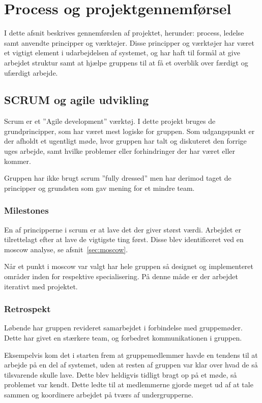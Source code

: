 \chapter{Process og projektgennemførsel}

I dette afsnit beskrives gennemførslen af projektet, herunder: process, ledelse samt anvendte principper og værktøjer. Disse principper og værktøjer har været et vigtigt element i udarbejdelsen af systemet, og har haft til formål at give arbejdet struktur samt at hjælpe gruppens til at få et overblik over færdigt og ufærdigt arbejde.

\section{SCRUM og agile udvikling}
Scrum er et ''Agile development'' \cite[kap. 1]{robertmartin2006} værktøj. I dette projekt bruges de grundprincipper, som har været mest logiske for gruppen. Som udgangspunkt er der afholdt et ugentligt møde, hvor gruppen har talt og diskuteret den forrige uges arbejde, samt hvilke problemer eller forhindringer der har været eller kommer.

Gruppen har ikke brugt scrum ''fully dressed'' men har derimod taget de principper og grundsten som gav mening for et mindre team.

\subsection{Milestones}
En af principperne i scrum er at lave det der giver størst værdi. Arbejdet er tilrettelagt efter at lave de vigtigste ting først. Disse blev identificeret ved en \gls{moscow} analyse, se afsnit~\ref{sec:moscow}.

Når et punkt i \gls{moscow} var valgt har hele gruppen så designet og implementeret områder inden for respektive specialisering. På denne måde er der arbejdet iterativt med projektet.

\subsection{Retrospekt}
Løbende har gruppen revideret samarbejdet i forbindelse med gruppemøder. Dette har givet en stærkere team, og forbedret kommunikationen i gruppen.

Eksempelvis kom det i starten frem at gruppemedlemmer havde en tendens til at arbejde på en del af systemet, uden at resten af gruppen var klar over hvad de så tilsvarende skulle lave.
Dette blev heldigvis tidligt bragt op på et møde, så problemet var kendt. Dette ledte til at medlemmerne gjorde meget ud af at tale sammen og koordinere arbejdet på tværs af undergrupperne.

